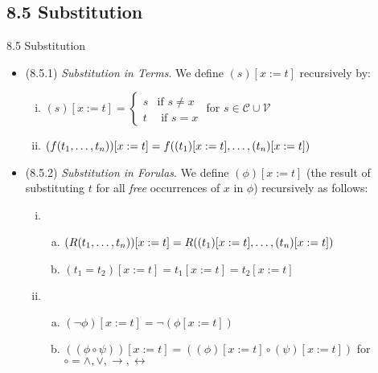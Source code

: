 \subsection{8.5 Substitution}
\begin{frame}{8.5 Substitution}

	\begin{itemize}
	
	
		\item (8.5.1) \emph{Substitution in Terms}. We define $(s)[x:=t]$ recursively by:
		
		\begin{enumerate}[(i)]
			
				\item $(s)[x:=t]=\begin{cases} s & \text{if } s\neq x\\ t & \text{ if }s=x\end{cases}$ for $s\in \mathcal{C}\cup\mathcal{V}$
				
				\item $(f(t_1,\mathellipsis, t_n))[x:=t]=f((t_1)[x:=t], \mathellipsis, (t_n)[x:=t])$
			
			\end{enumerate} 
			
			
		\item (8.5.2)  \emph{Substitution in Forulas}. We define $(\phi)[x:=t]$ (the result of substituting $t$ for all \emph{free} occurrences of $x$ in $\phi$) recursively as follows:
	
	
		\begin{enumerate}[(i)]
	
			\item \begin{enumerate}[(a)] 
			
				\item $(R(t_1, \mathellipsis, t_n))[x:=t]=R((t_1)[x:=t], \mathellipsis, (t_n)[x:=t])$
				
				\item $(t_1=t_2)[x:=t]=t_1[x:=t]=t_2[x:=t]$
				
			\end{enumerate}
			
			\item \begin{enumerate}[(a)] 

			\item $(\neg\phi)[x:=t]=\neg(\phi[x:=t])$

			
			\item $((\phi\circ\psi))[x:=t]=((\phi)[x:=t]\circ(\psi)[x:=t])$ for $\circ=\land,\lor,\to,\leftrightarrow$
			

\end{enumerate}
\end{enumerate}
\end{itemize}
\end{frame}
